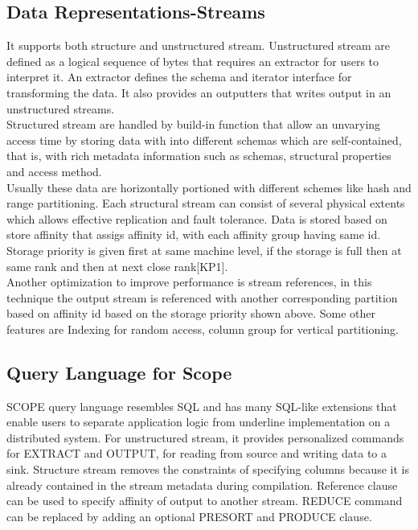 \documentclass[runningheads,a4paper]{llncs}
\begin{document}
\subsection*{Data Representations-Streams}
It supports both structure and unstructured stream.
Unstructured stream are defined as a logical sequence of bytes that requires an extractor for users to interpret it. An extractor defines the schema and iterator interface for transforming the data. It also provides an outputters that writes output in an unstructured streams.\\

Structured stream are handled by build-in function that allow an unvarying access time by storing data with into different schemas which are self-contained, that is, with rich metadata information such as schemas, structural properties and access method. \\

Usually these data are horizontally portioned with different schemes like hash and range partitioning. Each structural stream can consist of several physical extents which allows effective replication and fault tolerance. Data is stored based on store affinity that assigs affinity id, with each affinity group having same id. Storage priority is given first at same machine level, if the storage is full then at same rank and then at next close rank[KP1].\\

Another optimization to improve performance is stream references, in this technique the output stream is referenced with another corresponding partition based on affinity id based on the storage priority shown above. Some other features are Indexing for random access, column group for vertical partitioning.\\

\subsection*{Query Language for Scope}
SCOPE query language resembles SQL and has many SQL-like extensions that enable users to separate application logic from underline implementation on a distributed system. For unstructured stream, it provides personalized commands for EXTRACT and OUTPUT, for reading from source and writing data to a sink. Structure stream removes the constraints of specifying columns because it is already contained in the stream metadata during compilation. Reference clause can be used to specify affinity of output to another stream. REDUCE command can be replaced by adding an optional PRESORT and PRODUCE clause.
\end{document}
